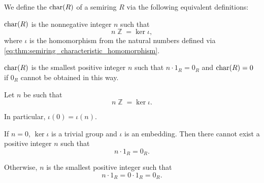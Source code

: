\begin{definition}\label{def:semiring_characteristic}\mimprovised
  We define the  \( \operatorname{char}(R) \) of a semiring \( R \) via the following equivalent definitions:
  \begin{thmenum}
     \( \operatorname{char}(R) \) is the nonnegative integer \( n \) such that
    \begin{equation*}
      n \BbbZ = \ker\iota,
    \end{equation*}
    where \( \iota \) is the homomorphism from the natural numbers defined via \eqref{eq:thm:semiring_characteristic_homomorphism}.

     \( \operatorname{char}(R) \) is the smallest positive integer \( n \) such that \( n \cdot 1_R = 0_R \) and \( \operatorname{char}(R) = 0 \) if \( 0_R \) cannot be obtained in this way.
  \end{thmenum}
\end{definition}
\begin{defproof}
   Let \( n \) be such that
  \begin{equation*}
    n \BbbZ = \ker\iota.
  \end{equation*}

  In particular, \( \iota(0) = \iota(n) \).

  If \( n = 0 \), \( \ker\iota \) is a trivial group and \( \iota \) is an embedding. Then there cannot exist a positive integer \( n \) such that
  \begin{equation*}
    n \cdot 1_R = 0_R.
  \end{equation*}

  Otherwise, \( n \) is the smallest positive integer such that
  \begin{equation*}
    n \cdot 1_R = 0 \cdot 1_R = 0_R.
  \end{equation*}
\end{defproof}

